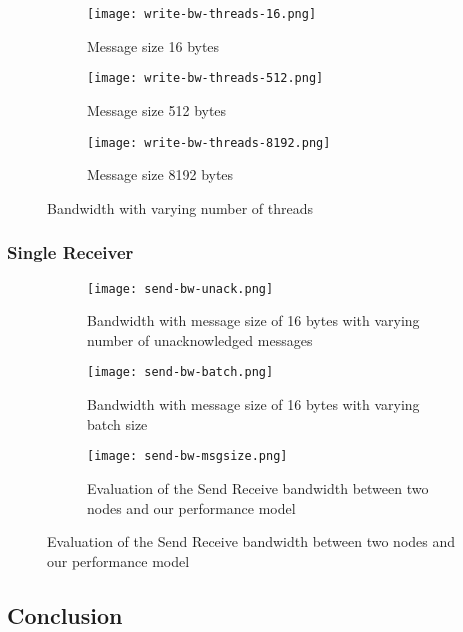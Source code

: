 \begin{figure}[]
  \centering
\begin{subfigure}[b]{0.49\textwidth}
  \centering
  \texttt{[image: write-bw-threads-16.png]}
  \caption{Message size 16 bytes}
  \label{fig:plot-write-bw-thread-16}
\end{subfigure}
\begin{subfigure}[b]{0.49\textwidth}
  \centering
  \texttt{[image: write-bw-threads-512.png]}
  \caption{Message size 512 bytes}
  \label{fig:plot-write-bw-thread-512}
\end{subfigure}
\begin{subfigure}[b]{0.49\textwidth}
  \centering
  \texttt{[image: write-bw-threads-8192.png]}
  \caption{Message size 8192 bytes}
  \label{fig:plot-write-bw-thread-8192}
\end{subfigure}
  \caption{Bandwidth with varying number of threads}
\end{figure}
\subsubsection{Single Receiver}

\begin{figure}[]
  \centering
\begin{subfigure}[b]{0.49\textwidth}
  \centering
  \texttt{[image: send-bw-unack.png]}
  \caption{Bandwidth with message size of 16 bytes with varying number of unacknowledged messages}
  \label{fig:plot-sndrcv-bw-unack}
\end{subfigure}
\begin{subfigure}[b]{0.49\textwidth}
  \centering
  \texttt{[image: send-bw-batch.png]}
  \caption{Bandwidth with message size of 16 bytes with varying batch size}
  \label{fig:plot-sndrcv-bw-batch}
\end{subfigure}
\begin{subfigure}[b]{0.49\textwidth}
  \centering
  \texttt{[image: send-bw-msgsize.png]}
  \caption{Evaluation of the Send Receive bandwidth between two nodes and our performance model}
  \label{fig:plot-sndrcv-bw}
\end{subfigure}
\end{figure}

\subsection{Conclusion}








